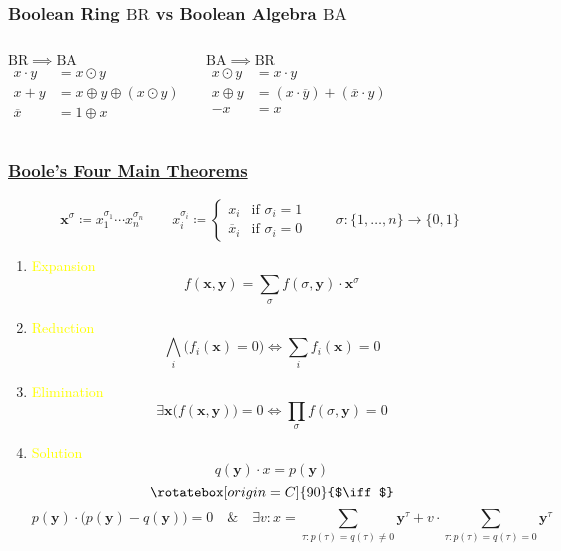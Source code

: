 \documentclass[UTF8,11pt,colorlinks,compress,openany]{beamer}%
\begin{document}
\begin{frame}\frametitle{Boolean Ring $\mathrm{BR}$ vs Boolean Algebra $\mathrm{BA}$}
	\begin{columns}
			\begin{block}{$\mathrm{BR} \implies \mathrm{BA}$}
			\setlength\abovedisplayskip{0pt}
				\begin{align*}
				x\cdot y&=x\odot y\\
				x+y&=x\oplus y\oplus(x\odot y)\\
				\overline{x}&=1\oplus x
				\end{align*}
			\end{block}
			\begin{block}{$\mathrm{BA} \implies \mathrm{BR}$}
			\setlength\abovedisplayskip{0pt}
				\begin{align*}
				x\odot y&=x\cdot y\\
				x\oplus y&=(x\cdot\overline{y})+(\overline{x}\cdot y)\\
				-x&=x
				\end{align*}
			\end{block}
	\end{columns}
\end{frame}

\begin{frame}\frametitle{\href{https://www.math.uwaterloo.ca/~snburris/htdocs/Theme2_talk_snburris.pdf}{Boole's Four Main Theorems}}
\setlength\abovedisplayskip{0pt}
\setlength\belowdisplayskip{0pt}\vspace{-1em}
	\[\mathbf{x}^\sigma\coloneqq x_1^{\sigma_1}\cdots x_n^{\sigma_n}\qquad x_i^{\sigma_i}\coloneqq 
	\begin{cases}
	x_i &\mbox{if } \sigma_i=1\\
	\overline{x}_i &\mbox{if } \sigma_i=0
	\end{cases}\qquad\sigma:\{1,\dots,n\}\to\{0,1\}\]
	\begin{enumerate}
		\item \textcolor{yellow}{Expansion}\vspace{-1em}
		\[f(\mathbf{x},\mathbf{y})=\sum_\sigma f(\sigma,\mathbf{y})\cdot \mathbf{x}^\sigma\]
		\item \textcolor{yellow}{Reduction}\vspace{-1em}
		\[\bigwedge_i\big(f_i(\mathbf{x})=0\big)\iff\sum_i f_i(\mathbf{x})=0\]
		\item \textcolor{yellow}{Elimination}\vspace{-1em}
		\[\exists \mathbf{x}\big(f(\mathbf{x},\mathbf{y})\big)=0\iff \prod_\sigma f(\sigma,\mathbf{y})=0\]
		\item \textcolor{yellow}{Solution}\vspace{-1em}
		\[q(\mathbf{y})\cdot x=p(\mathbf{y})\]
		\[\rotatebox[origin=C]{90}{$\iff$}\]
		\[p(\mathbf{y})\cdot\big(p(\mathbf{y})-q(\mathbf{y})\big)=0\quad\&\quad \exists v: x=\!\!\!\sum\limits_{\tau: p(\tau)=q(\tau)\neq 0}\!\!\!\!\!\mathbf{y}^\tau+v\cdot \!\!\!\!\!\sum\limits_{\tau: p(\tau)=q(\tau)=0}\!\!\!\!\!\mathbf{y}^\tau\]
	\end{enumerate}
\end{frame}
\end{document}
